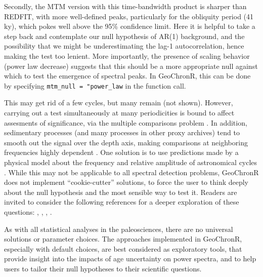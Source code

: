 \documentclass[gchron, manuscript]{copernicus}
\begin{document}
Secondly, the MTM version with this time-bandwidth product is sharper than REDFIT, with more well-defined peaks, particularly for the obliquity period (41 ky), which pokes well above the 95\% confidence limit. Here it is helpful to take a step back and contemplate our null hypothesis of AR(1) background, and the possibility that we might be underestimating the lag-1 autocorrelation, hence making the test too lenient. More importantly, the presence of scaling behavior (power law decrease) suggests that this should be a more appropriate null against which to test the emergence of spectral peaks. In GeoChronR, this can be done by specifying \texttt{mtm\_null\ =\ "power\_law} in the function call.

This may get rid of a few cycles, but many remain (not shown). However, carrying out a test simultaneously at many periodicities is bound to affect assesments of significance, via the multiple comparisons problem \citep{Vaughan_PP2011}. In addition, sedimentary processes (and many processes in other proxy archives) tend to smooth out the signal over the depth axis, making comparisons at neighboring frequencies highly dependent \citep{Meyers_2012}. One solution is to use predictions made by a physical model about the frequency and relative amplitude of astronomical cycles \citep{MeyersSageman_2007}. While this may not be applicable to all spectral detection problems, GeoChronR does not implement ``cookie-cutter'' solutions, to force the user to think deeply about the null hypothesis and the most sensible way to test it. Readers are invited to consider the following references for a deeper exploration of these questions: \citet{Vaughan_PP2011}, \citet{Meyers_2012}, \citet{Meyers_2015}, \citet{MeyersMalinverno2018}.

As with all statistical analyses in the paleosciences, there are no universal solutions or parameter choices.
The approaches implemented in GeoChronR, especially with default choices, are best considered as exploratory tools, that provide insight into the impacts of age uncertainty on power spectra, and to help users to tailor their null hypotheses to their scientific questions.

\conclusions
\end{document}
